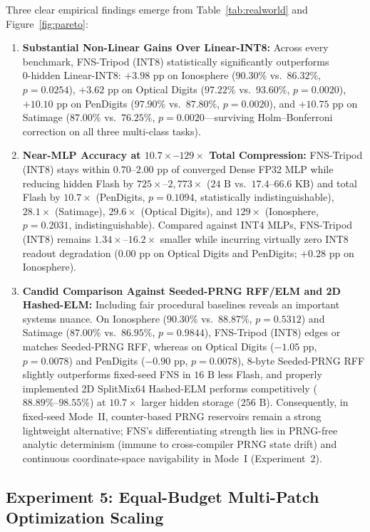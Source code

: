 Three clear empirical findings emerge from Table~\ref{tab:realworld} and Figure~\ref{fig:pareto}:
\begin{enumerate}
    \item \textbf{Substantial Non-Linear Gains Over Linear-INT8:} Across every benchmark, FNS-Tripod (INT8) statistically significantly outperforms $0\text{-hidden}$ Linear-INT8: $+3.98$ pp on Ionosphere ($90.30\%$ vs.\ $86.32\%$, $p=0.0254$), $+3.62$ pp on Optical Digits ($97.22\%$ vs.\ $93.60\%$, $p=0.0020$), $+10.10$ pp on PenDigits ($97.90\%$ vs.\ $87.80\%$, $p=0.0020$), and $+10.75$ pp on Satimage ($87.00\%$ vs.\ $76.25\%$, $p=0.0020$---surviving Holm--Bonferroni correction on all three multi-class tasks).
    \item \textbf{Near-MLP Accuracy at $10.7\times$--$129\times$ Total Compression:} FNS-Tripod (INT8) stays within $0.70\text{--}2.00$ pp of converged Dense FP32 MLP while reducing hidden Flash by $725\times$--$2{,}773\times$ ($24\text{ B}$ vs.\ $17.4\text{--}66.6\text{ KB}$) and total Flash by $10.7\times$ (PenDigits, $p=0.1094$, statistically indistinguishable), $28.1\times$ (Satimage), $29.6\times$ (Optical Digits), and $129\times$ (Ionosphere, $p=0.2031$, indistinguishable). Compared against INT4 MLPs, FNS-Tripod (INT8) remains $1.34\times$--$16.2\times$ smaller while incurring virtually zero INT8 readout degradation ($0.00$ pp on Optical Digits and PenDigits; $+0.28$ pp on Ionosphere).
    \item \textbf{Candid Comparison Against Seeded-PRNG RFF/ELM and 2D Hashed-ELM:} Including fair procedural baselines reveals an important systems nuance. On Ionosphere ($90.30\%$ vs.\ $88.87\%$, $p=0.5312$) and Satimage ($87.00\%$ vs.\ $86.95\%$, $p=0.9844$), FNS-Tripod (INT8) edges or matches Seeded-PRNG RFF, whereas on Optical Digits ($-1.05$ pp, $p=0.0078$) and PenDigits ($-0.90$ pp, $p=0.0078$), $8\text{-byte}$ Seeded-PRNG RFF slightly outperforms fixed-seed FNS in $16\text{ B}$ less Flash, and properly implemented 2D SplitMix64 Hashed-ELM performs competitively ($88.89\%\text{--}98.55\%$) at $10.7\times$ larger hidden storage ($256\text{ B}$). Consequently, in fixed-seed Mode~II, counter-based PRNG reservoirs remain a strong lightweight alternative; FNS's differentiating strength lies in PRNG-free analytic determinism (immune to cross-compiler PRNG state drift) and continuous coordinate-space navigability in Mode~I (Experiment~2).
\end{enumerate}

\subsection{Experiment 5: Equal-Budget Multi-Patch Optimization Scaling}
\label{sec:exp_es}

